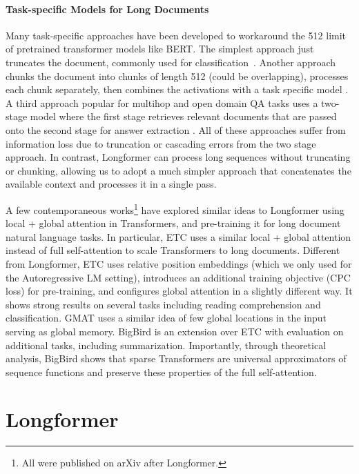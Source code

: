 \documentclass[11pt,a4paper]{article}
\newcommand{\model}{Longformer\xspace}
\begin{document}
\paragraph{Task-specific Models for Long Documents}
Many task-specific approaches have been developed to 
workaround the 512 limit of pretrained transformer models like BERT.
The simplest approach just truncates the document, commonly used for classification~\cite{truncateimdb}. 
Another approach chunks the document into chunks of 
length 512 (could be overlapping), processes each chunk separately, then combines the activations with a task specific model \cite{joshi-etal-2019-bert}.
A third approach popular for multihop and open domain QA tasks uses a two-stage model where the first stage retrieves relevant documents that are passed onto the second stage for answer extraction \cite{Clark2017SimpleAE,Chen2017ReadingWT}.
All of these approaches suffer from information loss due to truncation or cascading errors from the two stage approach.
In contrast, \model can process long sequences without truncating or chunking, allowing us to adopt a much simpler approach that concatenates the available context and processes it in a single pass. 

A few contemporaneous works\footnote{All were published on arXiv after Longformer.} have explored similar ideas to Longformer using local + global attention in Transformers, and pre-training it for long document natural language tasks. In particular, ETC \cite{ainslie-etal-2020-etc} uses a similar local + global attention instead of full self-attention to scale Transformers to long documents. Different from Longformer, ETC uses relative position embeddings (which we only used for the Autoregressive LM setting), introduces an additional training objective (CPC loss) for pre-training, and configures global attention in a slightly different way. It shows strong results on several tasks including reading comprehension and classification.
GMAT \cite{Gupta2020GMATGM} uses a similar idea of few global locations in the input serving as global memory. BigBird \cite{Zaheer2020BigBT} is an extension over ETC with evaluation on additional tasks, including summarization. Importantly, through theoretical analysis, BigBird shows that sparse Transformers are universal approximators of sequence functions and preserve these properties of the full self-attention.

 \section{Longformer}
\label{sec:model}
\end{document}
